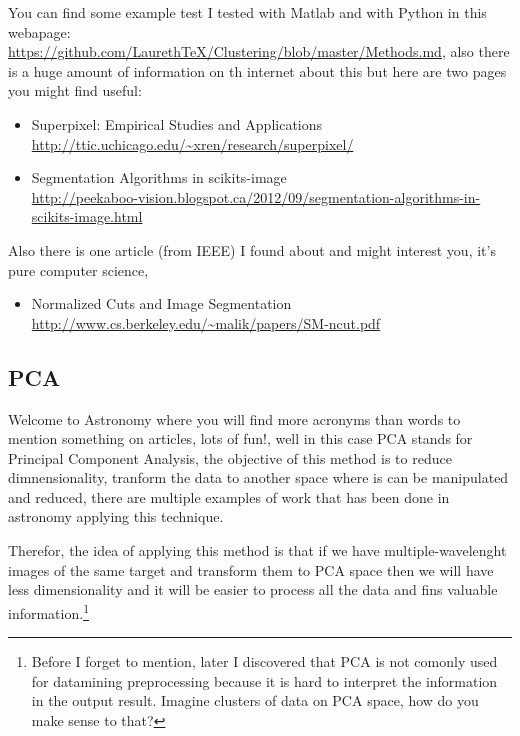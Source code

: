 \documentclass[11pt,fleqn]{book} %
\begin{document}
				\begin{remark}
					You can find some example test I tested with Matlab and with Python in this webapage: \url{https://github.com/LaurethTeX/Clustering/blob/master/Methods.md}, also there is a huge amount of information on th internet about this but here are two pages you might find useful:
					    \begin{itemize}
					        	\item Superpixel: Empirical Studies and Applications \\ \url{http://ttic.uchicago.edu/~xren/research/superpixel/}
							        \item Segmentation Algorithms in scikits-image \\ \url{http://peekaboo-vision.blogspot.ca/2012/09/segmentation-algorithms-in-scikits-image.html}
								    \end{itemize}
								        Also there is one article (from IEEE) I found about and might interest you, it's pure computer science,
									    \begin{itemize}
									        	\item Normalized Cuts and Image Segmentation \\ \url{http://www.cs.berkeley.edu/~malik/papers/SM-ncut.pdf}
											    \end{itemize}
											    \end{remark}

											    \subsection{PCA}

											    Welcome to Astronomy where you will find more acronyms than words to mention something on articles, lots of fun!, well in this case PCA stands for Principal Component Analysis, the objective of this method is to reduce dimnensionality, tranform the data to another space where is can be manipulated and reduced, there are multiple examples of work that has been done in astronomy applying this technique.

											    Therefor, the idea of applying this method is that if we have multiple-wavelenght images of the same target and transform them to PCA space then we will have less dimensionality and it will be easier to process all the data and fins valuable information.\footnote{Before I forget to mention, later I discovered that PCA is not comonly used for datamining preprocessing because it is hard to interpret the information in the output result. Imagine clusters of data on PCA space, how do you make sense to that?}
\end{document}
